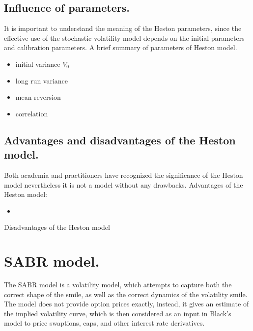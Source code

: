 \documentclass{book}
\begin{document}
\subsection{Influence of parameters.} 
It is important to understand the meaning of the Heston parameters, since the effective use of the stochastic volatility model depends on the initial parameters and calibration parameters. A brief summary of parameters of Heston model.
\begin{itemize}
\item initial variance $V_{0}$
\item long run variance
\item mean reversion
\item correlation
\end{itemize}
\subsection{Advantages and disadvantages of the Heston model.}
Both academia and practitioners have recognized the significance of the Heston model nevertheless it is not a model without any drawbacks.
Advantages of the Heston model:
\begin{itemize}
\item
\end{itemize}
Disadvantages of the Heston model
\section{SABR model.}
The SABR model is a volatility model, which attempts to capture both the correct shape of the smile, as well as the correct dynamics of the volatility smile. The model does not provide option prices exactly, instead, it gives an estimate of the implied volatility curve, which is then considered as an input in Black’s model to price swaptions, caps, and other interest rate derivatives.
\end{document}
